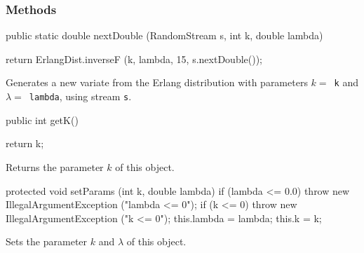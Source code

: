 \subsubsection* {Methods}
\begin{code}

   public static double nextDouble (RandomStream s, int k, double lambda) \begin{hide} {
      return ErlangDist.inverseF (k, lambda, 15, s.nextDouble());
   }\end{hide}
\end{code}
 \begin{tabb}
   Generates a new variate from the Erlang distribution with
   parameters $k = $~\texttt{k} and $\lambda = $~\texttt{lambda},
   using stream \texttt{s}.
 \end{tabb}
\begin{code}

   public int getK()\begin{hide} {
      return k;
   }\end{hide}
\end{code}
\begin{tabb} Returns the parameter $k$ of this object.
\end{tabb}
\begin{hide}\begin{code}

   protected void setParams (int k, double lambda) {
      if (lambda <= 0.0)
         throw new IllegalArgumentException ("lambda <= 0");
      if (k <= 0)
         throw new IllegalArgumentException ("k <= 0");
      this.lambda = lambda;
      this.k = k;
   }
\end{code}
\begin{tabb} Sets the parameter $k$ and $\lambda$ of this object.
\end{tabb}
\begin{code}
}\end{code}
\end{hide}
